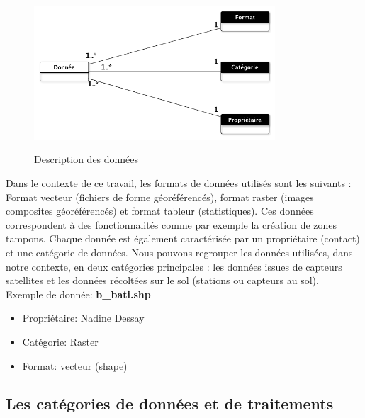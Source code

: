 \begin{figure}[H] 
\begin{center}
\includegraphics[width=9cm]{DescriptionDonnees}\\
\caption{\label{DescriptionDonnees} Description des données }
\end{center}
\end{figure}

Dans le contexte de ce travail, les formats de données utilisés sont les suivants : Format vecteur (fichiers de forme géoréférencés), format raster (images composites géoréférencés) et format tableur (statistiques). Ces données correspondent à des fonctionnalités comme par exemple la création de zones tampons. Chaque donnée est également caractérisée par un propriétaire (contact) et une catégorie de données. Nous pouvons regrouper les données utilisées, dans notre contexte, en deux catégories principales : les données issues de capteurs satellites et les données récoltées sur le sol (stations ou capteurs au sol).\\ 


Exemple de donnée: \textbf{b\_bati.shp}\\
\begin{itemize}

\item Propriétaire: Nadine Dessay
\item Catégorie: Raster
\item Format: vecteur (shape)

\end{itemize}

\newpage

\subsection{Les catégories de données et de traitements} \label{catdonnees}

